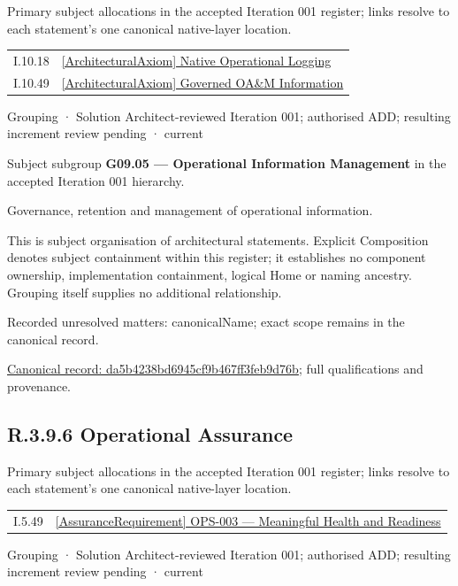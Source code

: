 Primary subject allocations in the accepted Iteration 001 register; links resolve to each statement’s one canonical native-layer location.\par
\begin{longtable}{p{.22\linewidth}p{.73\linewidth}}
I.10.18 & \hyperref[element:9d094b1b42644ab5aa2071a9460778e2]{[ArchitecturalAxiom] Native Operational Logging} \\
I.10.49 & \hyperref[element:43593f7a9566410ebc1aa30dbe935848]{[ArchitecturalAxiom] Governed OA\&M Information} \\
\end{longtable}
\label{element:da5b4238bd6945cf9b467ff3feb9d76b}
{\small Grouping · Solution Architect-reviewed Iteration 001; authorised ADD; resulting increment review pending · current}\par

Subject subgroup \textbf{G09.05 — Operational Information Management} in the accepted Iteration 001 hierarchy.



Governance, retention and management of operational information.



This is subject organisation of architectural statements. Explicit Composition denotes subject containment within this register; it establishes no component ownership, implementation containment, logical Home or naming ancestry. Grouping itself supplies no additional relationship.


{\small Recorded unresolved matters: canonicalName; exact scope remains in the canonical record.}\par
{\footnotesize \href{../../../../continuum/grouping/da5b4238bd6945cf9b467ff3feb9d76b.md}{Canonical record: da5b4238bd6945cf9b467ff3feb9d76b}; full qualifications and provenance.}\par
\subsection*{R.3.9.6 Operational Assurance}
\label{navigation:R.3.9.6}

Primary subject allocations in the accepted Iteration 001 register; links resolve to each statement’s one canonical native-layer location.\par
\begin{longtable}{p{.22\linewidth}p{.73\linewidth}}
I.5.49 & \hyperref[element:4c02fec3af264b878ee3e0cfaecbf55f]{[AssuranceRequirement] OPS-003 — Meaningful Health and Readiness} \\
\end{longtable}
\label{element:315ba7bbe4624223a97a7e7e6d9cc252}
{\small Grouping · Solution Architect-reviewed Iteration 001; authorised ADD; resulting increment review pending · current}\par


